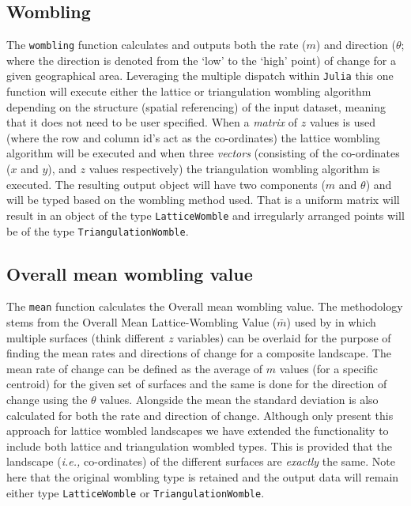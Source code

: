 \begin{refsection}
\subsection{Wombling}\label{wombling}

The \texttt{wombling} function calculates and outputs both the rate
(\(m\)) and direction (\(\theta\); where the direction is denoted from
the `low' to the `high' point) of change for a given geographical area.
Leveraging the multiple dispatch within \texttt{Julia} this one function
will execute either the lattice or triangulation wombling algorithm
depending on the structure (spatial referencing) of the input dataset,
meaning that it does not need to be user specified. When a \emph{matrix}
of \(z\) values is used (where the row and column id's act as the
co-ordinates) the lattice wombling algorithm will be executed and when
three \emph{vectors} (consisting of the co-ordinates (\(x\) and \(y\)),
and \(z\) values respectively) the triangulation wombling algorithm is
executed. The resulting output object will have two components (\(m\)
and \(\theta\)) and will be typed based on the wombling method used.
That is a uniform matrix will result in an object of the type
\texttt{LatticeWomble} and irregularly arranged points will be of the
type \texttt{TriangulationWomble}.

\subsection{Overall mean wombling
value}\label{overall-mean-wombling-value}

The \texttt{mean} function calculates the Overall mean wombling value.
The methodology stems from the Overall Mean Lattice-Wombling Value
(\(\bar{m}\)) used by \cite{Fortin1994EdgDet} in which multiple surfaces
(think different \(z\) variables) can be overlaid for the purpose of
finding the mean rates and directions of change for a composite
landscape. The mean rate of change can be defined as the average of
\(m\) values (for a specific centroid) for the given set of surfaces and
the same is done for the direction of change using the \(\theta\)
values. Alongside the mean the standard deviation is also calculated for
both the rate and direction of change. Although \cite{Fortin1994EdgDet} only
present this approach for lattice wombled landscapes we have extended
the functionality to include both lattice and triangulation wombled
types. This is provided that the landscape (\emph{i.e.,} co-ordinates) of
the different surfaces are \emph{exactly} the same. Note here that the
original wombling type is retained and the output data will remain
either type \texttt{LatticeWomble} or \texttt{TriangulationWomble}.


\end{refsection}

